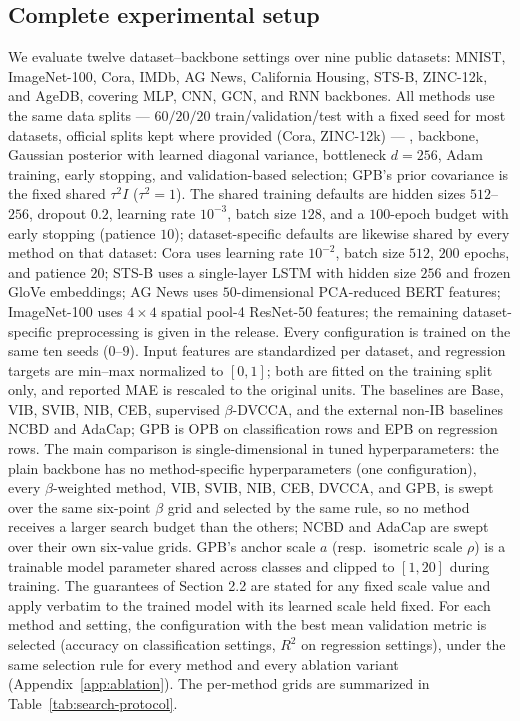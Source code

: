 \subsection{Complete experimental setup}
\label{app:setup-details}
We evaluate twelve dataset--backbone settings over nine public datasets:
MNIST, ImageNet-100, Cora, IMDb, AG News, California Housing, STS-B,
ZINC-12k, and AgeDB, covering MLP, CNN, GCN, and RNN backbones. All
methods use the same data splits --- $60/20/20$ train/validation/test
with a fixed seed for most datasets, official splits kept where provided
(Cora, ZINC-12k) --- , backbone, Gaussian posterior with learned diagonal
variance, bottleneck $d=256$, Adam training, early stopping, and
validation-based selection; GPB's prior covariance is the
fixed shared $\tau^2I$ ($\tau^2=1$). The shared training defaults are
hidden sizes $512$--$256$, dropout $0.2$, learning rate $10^{-3}$, batch
size $128$, and a $100$-epoch budget with early stopping (patience
$10$); dataset-specific defaults are likewise shared by every method on
that dataset: Cora uses learning rate $10^{-2}$, batch size $512$,
$200$ epochs, and patience $20$; STS-B uses a single-layer LSTM with
hidden size $256$ and frozen GloVe embeddings; AG News uses
$50$-dimensional PCA-reduced BERT features; ImageNet-100 uses $4\times4$
spatial pool-4 ResNet-50 features; the remaining dataset-specific
preprocessing is given in the release. Every configuration is trained
on the same ten seeds ($0$--$9$). Input features are standardized per
dataset, and regression targets are min--max normalized to $[0,1]$;
both are fitted on the training split only, and reported MAE is
rescaled to the original units. The baselines are Base, VIB, SVIB,
NIB, CEB, supervised $\beta$-DVCCA, and the external non-IB baselines
NCBD and AdaCap; GPB is OPB on classification rows and EPB on regression rows. The main
comparison is single-dimensional in tuned hyperparameters: the plain
backbone has no method-specific hyperparameters (one configuration),
every $\beta$-weighted method, VIB, SVIB, NIB, CEB, DVCCA, and GPB, is
swept over the same six-point $\beta$ grid and selected by the same
rule, so no method receives a larger search budget than the others;
NCBD and AdaCap are swept over their own six-value grids. GPB's anchor
scale $a$ (resp.\ isometric scale $\rho$) is a trainable model parameter
shared across classes and clipped to
$[1,20]$ during training. The guarantees of Section 2.2 are stated for
any fixed scale value and apply verbatim to the trained model with its
learned scale held fixed. For each method and setting, the
configuration with the best mean validation metric is selected (accuracy
on classification settings, $R^2$ on regression settings), under the
same selection rule for every method and every ablation variant
(Appendix~\ref{app:ablation}). The per-method grids are summarized in
Table~\ref{tab:search-protocol}.

